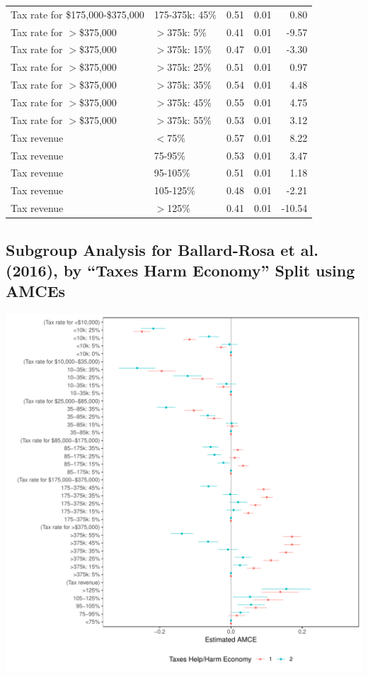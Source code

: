 \documentclass[a4paper,12pt]{article}\usepackage[]{graphicx}\usepackage[]{color}
\makeatletter
\def\maxwidth{ %
  \ifdim\Gin@nat@width>\linewidth
    \linewidth
  \else
    \Gin@nat@width
  \fi
}
\newenvironment{knitrout}{}{} %
\makeatother
\begin{document}
\begin{table}[ht]
\begin{tabular}{lp{1.5in}rrr}
  Tax rate for \$175,000-\$375,000 & 175-375k: 45\% & 0.51 & 0.01 & 0.80 \\ 
  Tax rate for $>$\$375,000 & $>$375k: 5\% & 0.41 & 0.01 & -9.57 \\ 
  Tax rate for $>$\$375,000 & $>$375k: 15\% & 0.47 & 0.01 & -3.30 \\ 
  Tax rate for $>$\$375,000 & $>$375k: 25\% & 0.51 & 0.01 & 0.97 \\ 
  Tax rate for $>$\$375,000 & $>$375k: 35\% & 0.54 & 0.01 & 4.48 \\ 
  Tax rate for $>$\$375,000 & $>$375k: 45\% & 0.55 & 0.01 & 4.75 \\ 
  Tax rate for $>$\$375,000 & $>$375k: 55\% & 0.53 & 0.01 & 3.12 \\ 
  Tax revenue & $<$75\% & 0.57 & 0.01 & 8.22 \\ 
  Tax revenue & 75-95\% & 0.53 & 0.01 & 3.47 \\ 
  Tax revenue & 95-105\% & 0.51 & 0.01 & 1.18 \\ 
  Tax revenue & 105-125\% & 0.48 & 0.01 & -2.21 \\ 
  Tax revenue & $>$125\% & 0.41 & 0.01 & -10.54 \\ 
   \hline
\end{tabular}
\end{table}


\clearpage

\subsection{Subgroup Analysis for Ballard-Rosa et al. (2016), by ``Taxes Harm Economy'' Split using AMCEs}

\begin{knitrout}
\color{fgcolor}
\includegraphics[width=\maxwidth]{figure/bms_subgroup_amce_appendix1-1} 

\end{knitrout}
\end{document}
